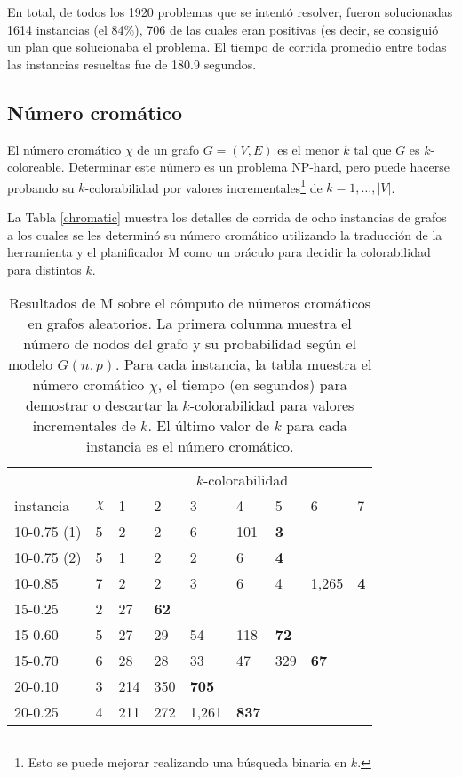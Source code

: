 En total, de todos los 1920 problemas que se intentó resolver, fueron
solucionadas 1614 instancias (el 84\%), 706 de las cuales eran positivas (es
decir, se consiguió un plan que solucionaba el problema. El tiempo de corrida
promedio entre todas las instancias resueltas fue de 180.9 segundos.

\subsection{Número cromático}

El número cromático $\chi$ de un grafo $G=(V,E)$ es el menor $k$ tal que $G$ es
$k$-coloreable. Determinar este número es un problema NP-hard, pero puede
hacerse probando su $k$-colorabilidad por valores incrementales\footnote{Esto
se puede mejorar realizando una búsqueda binaria en $k$.} de
$k=1,\ldots,|V|$.

La Tabla \ref{chromatic} muestra los detalles de corrida de ocho instancias de
grafos a los cuales se les determinó su número cromático utilizando la
traducción de la herramienta y el planificador M como un oráculo para decidir
la colorabilidad para distintos $k$.

\begin{table}[h!]
\centering
\small
\begin{tabular}{lllllllll}
       &       & \multicolumn{7}{c}{$k$-colorabilidad} \\
\cmidrule(l){3-9}
instancia      & $\chi$ &     1 &     2 &     3 &     4 &     5 &     6 &     7 \\
\midrule
10-0.75 (1)      &      5 &     2 &     2 &     6 &   101 &\bf  3 &       &       \\
10-0.75 (2)      &      5 &     1 &     2 &     2 &     6 &\bf  4 &       &       \\
10-0.85        &      7 &     2 &     2 &     3 &     6 &     4 & 1,265 &\bf  4 \\
15-0.25        &      2 &    27 &\bf 62 &       &       &       &       &       \\
15-0.60        &      5 &    27 &    29 &    54 &   118 &\bf 72 &       &       \\
15-0.70        &      6 &    28 &    28 &    33 &    47 &   329 &\bf 67 &       \\
20-0.10        &      3 &   214 &   350 &\bf705 &       &       &       &       \\ %
20-0.25        &      4 &   211 &   272 & 1,261 &\bf837 &       &       &       \\
\midrule
\end{tabular}
\caption[Resultados de M sobre números cromáticos]{
Resultados de M sobre el cómputo de números cromáticos en grafos aleatorios.
La primera columna muestra el número de nodos del grafo y su probabilidad según
el modelo $G(n,p)$.
Para cada instancia, la tabla muestra el número cromático $\chi$, el tiempo
(en segundos) para demostrar o descartar la $k$-colorabilidad para valores
incrementales de $k$.
El último valor de $k$ para cada instancia es el número cromático.}
\label{table:chromatic}
\end{table}

